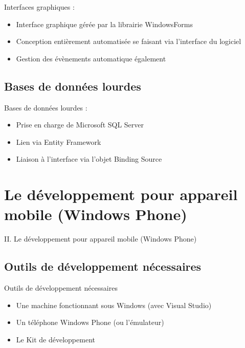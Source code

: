 \documentclass{beamer}
\begin{document}
\begin{frame}{Interfaces graphiques :}
  \begin{itemize}
  \item {
    Interface graphique gérée par la librairie WindowsForms
    \pause
  }
  \item {   
    Conception entièrement automatisée se faisant via l'interface du logiciel
    \pause
  }
  \item {
    Gestion des évènements automatique également
    \pause
  }
  \end{itemize}
\end{frame}

\subsection{Bases de données lourdes}

\begin{frame}{Bases de données lourdes :}
  \begin{itemize}
  \item {
    Prise en charge de Microsoft SQL Server
    \pause
  }
  \item {   
    Lien via Entity Framework
    \pause
  }
  \item {
    Liaison à l’interface via l’objet Binding Source
    \pause
  }
  \end{itemize}
\end{frame}

\section{Le développement pour appareil mobile (Windows Phone)}
    \begin{frame}{}
    \LARGE II. Le développement pour appareil mobile (Windows Phone)
    \end{frame}

\subsection{Outils de développement nécessaires}

\begin{frame}{Outils de développement nécessaires}
  \begin{itemize}
  \item {
    Une machine fonctionnant sous Windows (avec Visual Studio)
    \pause
  }
  \item {   
    Un téléphone Windows Phone (ou l’émulateur)
    \pause
  }
  \item {
    Le Kit de développement
    \pause
  }
  \end{itemize}
\end{frame}
\end{document}
